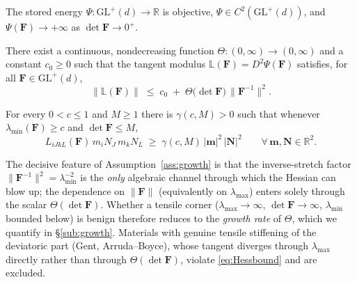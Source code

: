 \begin{assumption}
    \label{ass:reg}
    The stored energy $\Psi:\mathrm{GL}^+(d)\to\mathbb{R}$ is objective, $\Psi\in C^2(\mathrm{GL}^+(d))$, and
    $\Psi(\bm{F})\to+\infty$ as $\det \bm{F}\to 0^+$.
\end{assumption}

\begin{assumption}
    \label{ass:growth}
    There exist a continuous, nondecreasing function $\Theta:(0,\infty)\to(0,\infty)$ and a constant $c_0\ge 0$ such
    that the tangent modulus $\mathbb{L}(\bm{F})=D^2\Psi(\bm{F})$ satisfies, for all $\bm{F}\in\mathrm{GL}^+(d)$,
    \begin{equation}
        \label{eq:Hessbound}
        \| \mathbb{L}(\bm{F}) \| \;\le\; c_0 \;+\; \Theta\!\big(\det \bm{F}\big)\,\|\bm{F}^{-1}\|^{2}.
    \end{equation}
\end{assumption}

\begin{assumption}
    \label{ass:ellip}
    For every $0<c\le 1$ and $M\ge 1$ there is $\gamma(c,M)>0$ such that whenever $\lambda_{\min}(\bm{F})\ge c$ and
    $\det \bm{F}\le M$,
    \begin{equation}
        \label{eq:LH}
        L_{iJkL}(\bm{F})\, m_i N_J\, m_k N_L \;\ge\; \gamma(c,M)\,|\bm{m}|^2\,|\bm{N}|^2
        \qquad \forall\, \bm{m},\bm{N}\in\mathbb{R}^2 .
    \end{equation}
\end{assumption}

The decisive feature of Assumption~\ref{ass:growth} is that the inverse-stretch factor
$\|\bm{F}^{-1}\|^2=\lambda_{\min}^{-2}$ is the \emph{only} algebraic channel through which the Hessian can blow up; the
dependence on $\|\bm{F}\|$ (equivalently on $\lambda_{\max}$) enters solely through the scalar $\Theta(\det \bm{F})$.
Whether a tensile corner ($\lambda_{\max}\to\infty$, $\det \bm{F}\to\infty$, $\lambda_{\min}$ bounded below) is benign
therefore reduces to the \emph{growth rate} of $\Theta$, which we quantify in \S\ref{sub:growth}. Materials with
genuine tensile stiffening of the deviatoric part (Gent, Arruda--Boyce), whose tangent diverges through
$\lambda_{\max}$ directly rather than through $\Theta(\det\bm F)$, violate \eqref{eq:Hessbound} and are excluded.

